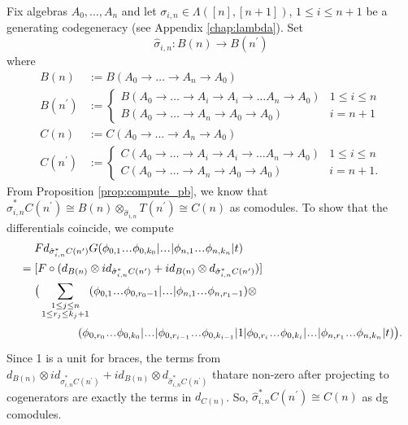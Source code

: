 \begin{eg}
\label{eg:pb4}
Fix algebras $A_0, \dots, A_n$ and let 
$\sigma_{i,n} \in \Lambda([n],[n+1])$, 
$1 \leq i \leq n+1$ be a generating 
codegeneracy (see Appendix 
\ref{chap:lambda}). Set
$$
\hat{\sigma}_{i,n}: B(n) \to 
B(n^\prime)
$$
where 
\begin{align*}
B(n) 
&:= 
B(A_0 \to \dots \to A_n \to A_0)\\
B(n^\prime) 
&:= 
\begin{cases}
  B(A_0 \to \dots \to A_i \to A_i 
    \to \dots A_n \to A_0)
  & 1 \leq i \leq n \\
  B(A_0 \to \dots \to A_n \to A_0 \to A_0)
  & i = n+1
\end{cases}\\
C(n) 
&:= 
C(A_0 \to \dots \to A_n \to A_0)\\
C(n^\prime) 
&:= 
\begin{cases}
  C(A_0 \to \dots \to A_i \to A_i 
    \to \dots A_n \to A_0)
  & 1 \leq i \leq n \\
  C(A_0 \to \dots \to A_n \to A_0 \to A_0)
  & i = n+1.
\end{cases}
\end{align*}
From Proposition \ref{prop:compute_pb}, we 
know that $\hat{\sigma}_{i,n}^*C(n^\prime) 
\cong B(n) \otimes_{\hat{\sigma}_{i,n}} 
T(n^\prime) \cong C(n)$ as comodules.
To show that the differentials coincide, 
we compute 
\begin{align*}
& \phantom{{}={}}
Fd_{\hat{\sigma}_{i,n}^*C(n^\prime)}G
  (\phi_{0,1} \smdots \phi_{0,k_0} | \smdots |
  \phi_{n,1} \smdots \phi_{n,k_n} | t) \\
&=
[F \circ (d_{B(n)}\otimes 
  id_{\hat{\sigma}_{i,n}^*C(n^\prime)} + 
  id_{B(n)} \otimes 
  d_{\hat{\sigma}_{i,n}^*C(n^\prime)})] \\
& \phantom{{}=  {}}
\big( \sum \limits_{\substack{1 \leq j \leq n\\
  1 \leq r_j \leq k_j+1}}
  (\phi_{0,1} \smdots \phi_{0,r_0-1} | \smdots |
  \phi_{n,1} \smdots \phi_{n,r_1-1} ) \otimes \\
&\phantom{{}= \big( \sum \sum {}}
  (\phi_{0,r_0}\smdots \phi_{0,k_0}| \smdots |
  \phi_{0,r_{i-1}}\smdots \phi_{0,k_{i-1}}| 1 |
  \phi_{0,r_i}\smdots \phi_{0,k_i}| \smdots |
  \phi_{n,r_1}\smdots \phi_{n,k_n} | t) \big).
\end{align*}
Since 1 is a unit for braces, the terms from 
$d_{B(n)} \otimes id_{\hat{\sigma}_{i,n}^*C(n^\prime)} 
+ id_{B(n)} \otimes d_{\hat{\sigma}_{i,n}^*C(n^\prime)}$ 
thatare non-zero after projecting to cogenerators 
are exactly the terms in $d_{C(n)}$. 
So, $\hat{\sigma}_{i,n}^*C(n^\prime) \cong C(n)$ 
as dg comodules.
\end{eg}
